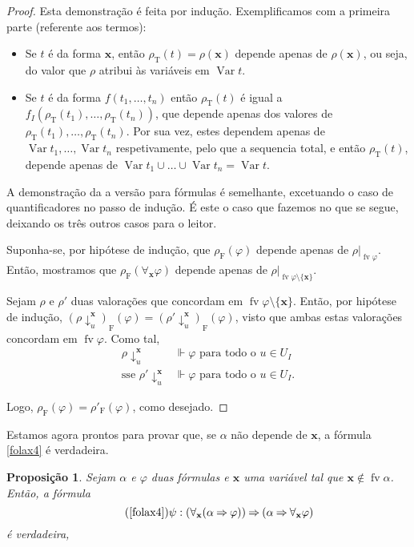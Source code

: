 \documentclass{report}
\newtheorem{prop}{Proposição}
\theoremstyle{definition}
\theoremstyle{remark}
\renewcommand{\bf}[1]{\mathbf{#1}}
\newcommand{\F}{\mathrm{F}}
\newcommand{\T}{\mathrm{T}}
\DeclareMathOperator{\var}{Var}
\DeclareMathOperator{\fv}{fv}
\newcommand{\imply}{\mathbin{\Rightarrow}}
\begin{document}
	\begin{proof}
	Esta demonstração é feita por indução. Exemplificamos com a primeira parte (referente aos termos):
	
	\begin{itemize}
	\item Se $t$ é da forma $\bf x$, então $\rho_\T(t) = \rho(\bf x)$ depende apenas de $\rho(\bf x)$, ou seja, do valor que $\rho$ atribui às variáveis em $\var t$.
	
	\item Se $t$ é da forma $f(t_1, \dots, t_n)$ então $\rho_\T(t)$ é igual a $f_I(\rho_\T(t_1), \dots, \rho_\T(t_n))$, que depende apenas dos valores de $\rho_\T(t_1), \dots, \rho_\T(t_n)$. Por sua vez, estes dependem apenas de $\var t_1, \dots, \var t_n$ respetivamente, pelo que a sequencia total, e então $\rho_\T(t)$, depende apenas de $\var t_1 \cup \dots \cup \var t_n = \var t$.
	\end{itemize}
	
	A demonstração da a versão para fórmulas é semelhante, excetuando o caso de quantificadores no passo de indução. É este o caso que fazemos no que se segue, deixando os três outros casos para o leitor.
	
	Suponha-se, por hipótese de indução, que $\rho_\F(\varphi)$ depende apenas de $\rho|_{\fv \varphi}$. Então, mostramos que $\rho_\F(\forall_{\bf x} \varphi)$ depende apenas de $\rho|_{\fv \varphi \setminus \{\bf x\}}$.
	
	Sejam $\rho$ e $\rho'$ duas valorações que concordam em $\fv \varphi \setminus \{\bf x\}$. Então, por hipótese de indução, $(\rho\!\downarrow^{\bf x}_u)_\F(\varphi) = (\rho'\!\downarrow^{\bf x}_u)_\F(\varphi)$, visto que ambas estas valorações concordam em $\fv \varphi$. Como tal,
	\begin{align*}\rho\!\downarrow^{\bf x}_u &\Vdash \varphi \text{ para todo o $u \in U_I$}\\
	\text{sse }
	\rho'\!\downarrow^{\bf x}_u &\Vdash \varphi \text{ para todo o $u \in U_I$.}
\end{align*}
	
	Logo, $\rho_\F(\varphi) = \rho'_\F(\varphi)$, como desejado.
	\end{proof}
	
	Estamos agora prontos para provar que, se $\alpha$ não depende de $\bf x$, a fórmula \eqref{folax4} é verdadeira.
	
	\begin{prop}\label{fol:folax4verdadeira}
	Sejam $\alpha$ e $\varphi$ duas fórmulas e $\bf x$ uma variável tal que $\bf x \not \in \fv\alpha$. Então, a fórmula
	\begin{equation}\tag{\ref{folax4}}
	\psi : (\forall_{\bf x} (\alpha \imply \varphi)) \imply (\alpha \imply \forall_{\bf x} \varphi)
	\end{equation}
	é verdadeira,
	\end{prop}
	
\end{document}
